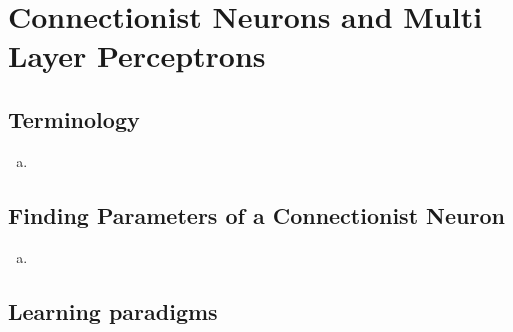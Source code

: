 \documentclass[11pt,a4paper]{article}
\begin{document}
\pagestyle{fancy}

\section{Connectionist Neurons and Multi Layer Perceptrons}

\subsection{Terminology}

\begin{enumerate}[a)]
\item


\end{enumerate}
\subsection{Finding Parameters of a Connectionist Neuron}

\begin{enumerate}[a)]
\item


\end{enumerate}
\subsection{Learning paradigms}
\end{document}
